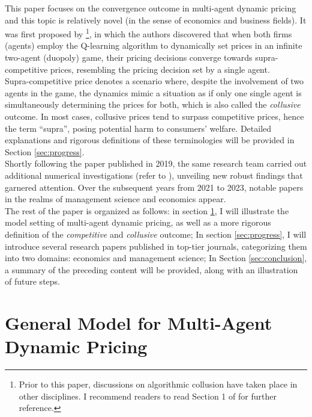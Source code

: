 \documentclass[12pt]{article}
\begin{document}
This paper focuses on the convergence outcome in multi-agent dynamic pricing and this topic is relatively novel (in the sense of economics and business fields). It was first proposed by \cite{calvano2019algorithmic}\footnote{Prior to this paper, discussions on algorithmic collusion have taken place in other disciplines. I recommend readers to read Section 1 of \cite{loots2023data} for further reference.}, in which the authors discovered that when both firms (agents) employ the Q-learning algorithm to dynamically set prices in an infinite two-agent (duopoly) game, their pricing decisions converge towards supra-competitive prices, resembling the pricing decision set by a single agent.\\

Supra-competitive price denotes a scenario where, despite the involvement of two agents in the game, the dynamics mimic a situation as if only one single agent is simultaneously determining the prices for both, which is also called the \textit{collusive} outcome. In most cases, collusive prices tend to surpass competitive prices, hence the term ``supra'', posing potential harm to consumers' welfare. Detailed explanations and rigorous definitions of these terminologies will be provided in Section \ref{sec:progress}.\\

Shortly following the paper published in 2019, the same research team carried out additional numerical investigations (refer to \cite{calvano2020artificial}), unveiling new robust findings that garnered attention. Over the subsequent years from 2021 to 2023, notable papers in the realms of management science and economics appear. \\

The rest of the paper is organized as follows: in section \ref{sec:model}, I will illustrate the model setting of multi-agent dynamic pricing, as well as a more rigorous definition of the \textit{competitive} and \textit{collusive} outcome; In section \ref{sec:progress}, I will introduce several research papers published in top-tier journals, categorizing them into two domains: economics and management science; In Section \ref{sec:conclusion}, a summary of the preceding content will be provided, along with an illustration of future steps.\\

\section{General Model for Multi-Agent Dynamic Pricing}\label{sec:model}
\end{document}
